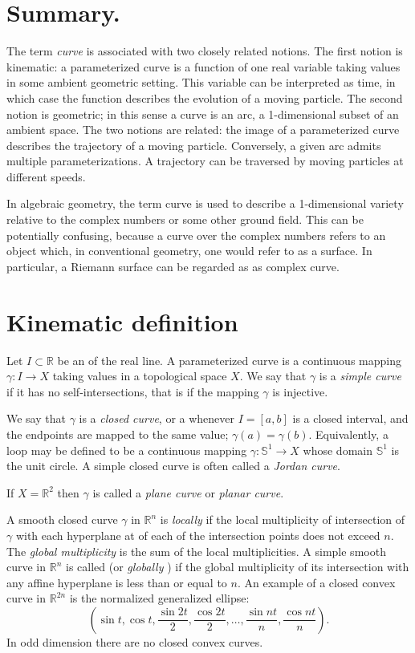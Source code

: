 \documentclass[12pt]{article}
\newcommand{\Rset}{\mathbb{R}}
\begin{document}
\section*{Summary.}
The term \emph{curve} is associated with two closely related notions.
The first notion is kinematic: a parameterized curve is a function of
one real variable taking values in some ambient geometric setting.
This variable can be interpreted as time, in which case the function
describes the evolution of a moving particle. The second notion is
geometric; in this sense a curve is an arc, a 1-dimensional subset of
an ambient space. The two notions are related: the image of a
parameterized curve describes the trajectory of a moving particle.
Conversely, a given arc admits multiple parameterizations.  A
trajectory can be traversed by moving particles at different speeds.

In algebraic geometry, the term curve is used to describe a
1-dimensional variety relative to the complex numbers or some other
ground field.  This can be potentially confusing, because a curve over
the complex numbers refers to an object which, in conventional
geometry, one would refer to as a surface. In particular, a Riemann
surface can be regarded as as complex curve.

\section*{Kinematic definition}
Let $I\subset \Rset$ be an  of the real line. A parameterized
curve is a continuous mapping $\gamma:I\to X$ taking values in a
topological space $X$. We say that $\gamma$ is a \emph{simple curve}
if it has no self-intersections, that is if the mapping $\gamma$ is
injective.

We say that $\gamma$ is a \emph{closed curve}, or a
\emph{} whenever $I=[a,b]$ is a closed
interval, and the endpoints are mapped to the same value;
$\gamma(a)=\gamma(b).$ Equivalently, a loop may be defined to be a
continuous mapping $\gamma \colon \mathbb{S}^1\to X$ whose domain
$\mathbb{S}^1$ is the unit circle. A simple closed curve is often
called a \emph{Jordan curve}.

If $X=\mathbb{R}^2$ then $\gamma$ is called a \emph{plane curve} or \emph{planar curve}.

A smooth closed curve $\gamma$ in $\mathbb{R}^n$ is \emph{locally } 
if the local multiplicity of intersection  
of $\gamma$ with each hyperplane at of each of the intersection points does not
exceed $n$. The \emph{global multiplicity} is the sum of the local
multiplicities. 
A simple smooth curve in $\mathbb{R}^n$ is called \emph{} (or 
\emph{globally }) if the global multiplicity
of its intersection with any affine hyperplane is less than or equal to $n$.
An example of a closed convex curve in $\mathbb{R}^{2n}$ is the normalized
generalized ellipse:
$$
(\sin t, \cos t, \frac{\sin 2t}{2}, \frac{\cos 2t}{2}, \ldots , \frac{\sin nt}{n}, \frac{\cos nt}{n}).
$$
In odd dimension there are no closed convex curves. 
\end{document}
